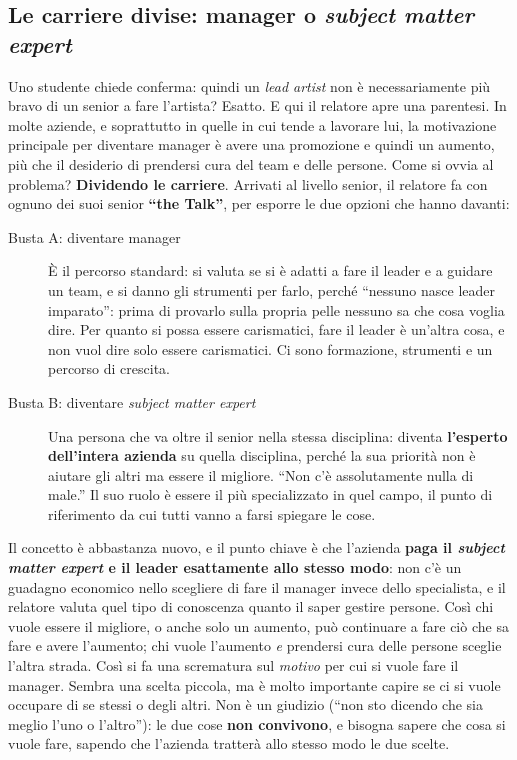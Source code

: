\subsection{Le carriere divise: manager o \emph{subject matter expert}}

Uno studente chiede conferma: quindi un \emph{lead artist} non è necessariamente più bravo
di un senior a fare l'artista? Esatto. E qui il relatore apre una parentesi. In molte
aziende, e soprattutto in quelle in cui tende a lavorare lui, la motivazione principale per
diventare manager è avere una promozione e quindi un aumento, più che il desiderio di
prendersi cura del team e delle persone. Come si ovvia al problema? \textbf{Dividendo le
carriere}. Arrivati al livello senior, il relatore fa con ognuno dei suoi senior
\textbf{``the Talk''}, per esporre le due opzioni che hanno davanti:
\begin{description}
  \item[Busta A: diventare manager] È il percorso standard: si valuta se si è adatti a fare
        il leader e a guidare un team, e si danno gli strumenti per farlo, perché
        ``nessuno nasce leader imparato'': prima di provarlo sulla propria pelle nessuno sa
        che cosa voglia dire. Per quanto si possa essere carismatici, fare il leader è
        un'altra cosa, e non vuol dire solo essere carismatici. Ci sono formazione,
        strumenti e un percorso di crescita.
  \item[Busta B: diventare \emph{subject matter expert}] Una persona che va oltre il senior
        nella stessa disciplina: diventa \textbf{l'esperto dell'intera azienda} su quella
        disciplina, perché la sua priorità non è aiutare gli altri ma essere il migliore.
        ``Non c'è assolutamente nulla di male.'' Il suo ruolo è essere il più specializzato
        in quel campo, il punto di riferimento da cui tutti vanno a farsi spiegare le cose.
\end{description}
Il concetto è abbastanza nuovo, e il punto chiave è che l'azienda \textbf{paga il
\emph{subject matter expert} e il leader esattamente allo stesso modo}: non c'è un guadagno
economico nello scegliere di fare il manager invece dello specialista, e il relatore valuta
quel tipo di conoscenza quanto il saper gestire persone. Così chi vuole essere il migliore,
o anche solo un aumento, può continuare a fare ciò che sa fare e avere l'aumento; chi vuole
l'aumento \emph{e} prendersi cura delle persone sceglie l'altra strada. Così si fa una scrematura sul
\emph{motivo} per cui si vuole fare il manager. Sembra una scelta piccola, ma è molto
importante capire se ci si vuole occupare di se stessi o degli altri. Non è un giudizio
(``non sto dicendo che sia meglio l'uno o l'altro''): le due cose \textbf{non convivono}, e
bisogna sapere che cosa si vuole fare, sapendo che l'azienda tratterà allo stesso modo le
due scelte.

